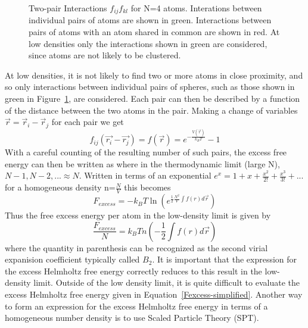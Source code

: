 \documentclass[12pt]{article}
\begin{document}
  \begin{figure}[h!]
    \centering
    \caption{Two-pair Interactions $f_{ij}f_{kl}$ for N=4 atoms. Interations between individual pairs of atoms are shown in green. 
             Interactions between pairs of atoms with an atom shared in common are shown in red. 
             At low densities only the interactions shown in green are considered, since atoms are not likely to be clustered.}
    \label{fig:diagrammic}
  \end{figure}

At low densities, it is not likely to find two or more atoms in close proximity, and so only interactions between individual pairs of spheres, such as those shown in green in Figure~\ref{fig:diagrammic}, are considered.
Each pair can then be described by a function of the distance between the two atoms in the pair. Making a change of variables $\vec{r}=\vec{r}_i-\vec{r}_j $ for each pair we get 
\begin{equation}f_{ij}(\vec{r_i}-\vec{r_j})=f(\vec{r})=e^{-\frac{V(\vec{r})}{k_BT}}-1\end{equation} 
\color{black}
With a careful counting of the resulting number of such pairs, the excess free energy can then be written as 
where in the thermodynamic limit (large N), $N-1, N-2, ...\approx{N}$. 
Written in terms of an exponential $e^x=1+x+\frac{x^2}{2!}+\frac{x^3}{3!}+ ...$ for a homogeneous density n=$\frac{N}{V}$ this becomes
\begin{equation}{F_{excess}=-k_BT\ln{\left(e^{\frac{1}{2}\frac{N^2}{V}\int{f(r)}{d\vec{r}}}\right)}}\end{equation} 
Thus the free excess energy per atom in the low-density limit is given by 
\begin{equation}{\frac{F_{excess}}{N}=k_BTn\left(-\frac{1}{2}\int{f(r)}{d\vec{r}}\right)}\end{equation} where the quantity in parenthesis can be recognized 
as the second virial expanision coefficient typically called $B_2$. %
It is important that the expression for the excess Helmholtz free energy correctly reduces to this result in the low-density limit. 
Outside of the low density limit, it is quite difficult to evaluate the excess Helmholtz free energy given in Equation~\ref{Fexcess-simplified}. 
Another way to form an expression for the excess Helmholtz free energy in terms of a homogeneous number density is to use Scaled Particle Theory (SPT).
\end{document}
